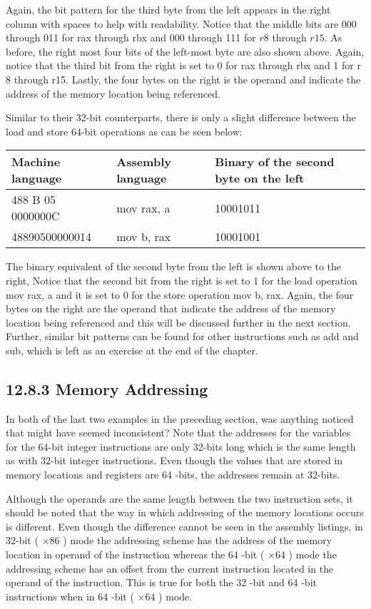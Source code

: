 \documentclass[10pt]{article}
\begin{document}
Again, the bit pattern for the third byte from the left appears in the right column with spaces to help with readability. Notice that the middle bits are 000 through 011 for rax through rbx and 000 through 111 for $r 8$ through $r 15$. As before, the right most four bits of the left-most byte are also shown above. Again, notice that the third bit from the right is set to 0 for rax through rbx and 1 for r 8 through r15. Lastly, the four bytes on the right is the operand and indicate the address of the memory location being referenced.

Similar to their 32-bit counterparts, there is only a slight difference between the load and store 64-bit operations as can be seen below:

\begin{center}
\begin{tabular}{|l|l|l|}
\hline
Machine language & Assembly language & Binary of the second byte on the left \\
\hline
488 B 05 0000000C & mov rax, a & 10001011 \\
\hline
48890500000014 & mov b, rax & 10001001 \\
\hline
\end{tabular}
\end{center}

The binary equivalent of the second byte from the left is shown above to the right, Notice that the second bit from the right is set to 1 for the load operation mov rax, a and it is set to 0 for the store operation mov b, rax. Again, the four bytes on the right are the operand that indicate the address of the memory location being referenced and this will be discussed further in the next section. Further, similar bit patterns can be found for other instructions such as add and sub, which is left as an exercise at the end of the chapter.

\subsection*{12.8.3 Memory Addressing}
In both of the last two examples in the preceding section, was anything noticed that might have seemed inconsistent? Note that the addresses for the variables for the 64-bit integer instructions are only 32-bits long which is the same length as with 32-bit integer instructions. Even though the values that are stored in memory locations and registers are 64 -bits, the addresses remain at 32-bits.

Although the operands are the same length between the two instruction sets, it should be noted that the way in which addressing of the memory locations occurs is different. Even though the difference cannot be seen in the assembly listings, in 32-bit ( $\times 86$ ) mode the addressing scheme has the address of the memory location in operand of the instruction whereas the 64 -bit ( $\times 64$ ) mode the addressing scheme has an offset from the current instruction located in the operand of the instruction. This is true for both the 32 -bit and 64 -bit instructions when in 64 -bit ( $\times 64$ ) mode.
\end{document}
